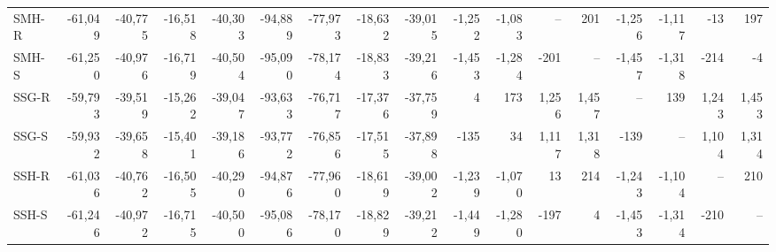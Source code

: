 \documentclass[]{article}
\begin{document}
\begin{landscape}
\begin{table}
\begin{tabular}[t]{lrrrrrrrrrrrrrrrr}
SMH-R & -61,049 & -40,775 & -16,518 & -40,303 & -94,889 & -77,973 & -18,632 & -39,015 & -1,252 & -1,083 & -- & 201 & -1,256 & -1,117 & -13 & 197\\
SMH-S & -61,250 & -40,976 & -16,719 & -40,504 & -95,090 & -78,174 & -18,833 & -39,216 & -1,453 & -1,284 & -201 & -- & -1,457 & -1,318 & -214 & -4\\
\addlinespace
SSG-R & -59,793 & -39,519 & -15,262 & -39,047 & -93,633 & -76,717 & -17,376 & -37,759 & 4 & 173 & 1,256 & 1,457 & -- & 139 & 1,243 & 1,453\\
SSG-S & -59,932 & -39,658 & -15,401 & -39,186 & -93,772 & -76,856 & -17,515 & -37,898 & -135 & 34 & 1,117 & 1,318 & -139 & -- & 1,104 & 1,314\\
SSH-R & -61,036 & -40,762 & -16,505 & -40,290 & -94,876 & -77,960 & -18,619 & -39,002 & -1,239 & -1,070 & 13 & 214 & -1,243 & -1,104 & -- & 210\\
SSH-S & -61,246 & -40,972 & -16,715 & -40,500 & -95,086 & -78,170 & -18,829 & -39,212 & -1,449 & -1,280 & -197 & 4 & -1,453 & -1,314 & -210 & --\\
\bottomrule
\end{tabular}
\end{table}
\end{landscape}
\end{document}
